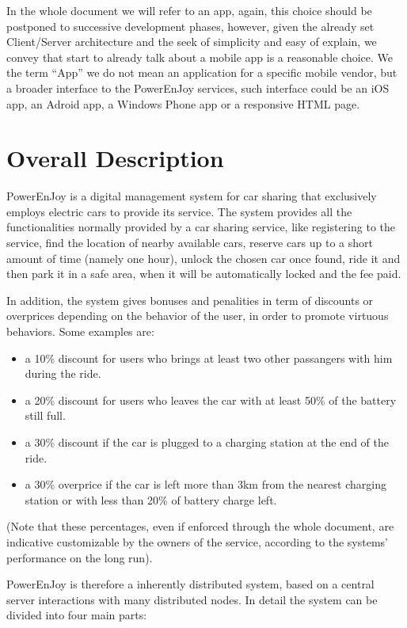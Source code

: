 \documentclass[11pt]{article} %
\newcommand{\pe}{PowerEnJoy }
\begin{document}
In the whole document we will refer to an app, again, this choice should be postponed to successive development phases, however, given the already set Client/Server architecture and the seek of simplicity and easy of explain, we convey that start to already talk about a mobile app is a reasonable choice.
We the term ``App'' we do not mean an application for a specific mobile vendor, but a broader interface to the \pe services, such interface could be an iOS app, an Adroid app, a Windows Phone app or a responsive HTML page.

\section{Overall Description}

\pe is a digital management system for car sharing that exclusively employs electric cars to provide its service. The system provides all the functionalities normally provided by a car sharing service, like registering to the service, find the location of nearby available cars, reserve cars up to a short amount of time (namely one hour), unlock the chosen car once found, ride it and then park it in a safe area, when it will be automatically locked and the fee paid.

In addition, the system gives bonuses and penalities in term of discounts or overprices depending on the behavior of the user, in order to promote virtuous behaviors. Some examples are:

\begin{itemize}
	\item a 10\% discount for users who brings at least two other
 passangers with him during the ride.
	\item a 20\% discount for users who leaves the car with at least 50\% of the battery still full.
	\item a 30\% discount if the car is plugged to a charging station at the end of the ride.
	\item a 30\% overprice if the car is left more than 3km from the nearest charging station or with less than 20\% of battery charge left.
\end{itemize}
(Note that these percentages, even if enforced through the whole document, are indicative customizable by the owners of the service, according to the systems' performance on the long run).

\pe is therefore a inherently distributed system, based on a central server interactions with many distributed nodes. In detail the system can be divided into four main parts: 
\end{document}
